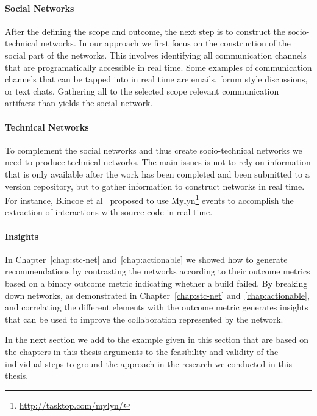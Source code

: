\paragraph{Social Networks}
After the defining the scope and outcome, the next step is to construct the socio-technical networks.
In our approach we first focus on the construction of the social part of the networks.
This involves identifying all communication channels that are programatically accessible in real time.
Some examples of communication channels that can be tapped into in real time are emails, forum style discussions, or text chats.
Gathering all to the selected scope relevant communication artifacts than yields the social-network.

\paragraph{Technical Networks}
To complement the social networks and thus create socio-technical networks we need to produce technical networks.
The main issues is not to rely on information that is only available after the work has been completed and been submitted to a version repository, but to gather information to construct networks in real time.
For instance, Blincoe et al~\cite{blincoe:cscw:2012} proposed to use Mylyn\footnote{\url{http://tasktop.com/mylyn/}} events to accomplish the extraction of interactions with source code in real time.

\paragraph{Insights}
In Chapter~\ref{chap:stc-net} and~\ref{chap:actionable} we showed how to generate recommendations by contrasting the networks according to their outcome metrics based on a binary outcome metric indicating whether a build failed.
By breaking down networks, as demonstrated in Chapter~\ref{chap:stc-net} and~\ref{chap:actionable}, and correlating the different elements with the outcome metric generates insights that can be used to improve the collaboration represented by the network.

In the next section we add to the example given in this section that are based on the chapters in this thesis arguments to the feasibility and validity of the individual steps to ground the approach in the research we conducted in this thesis.